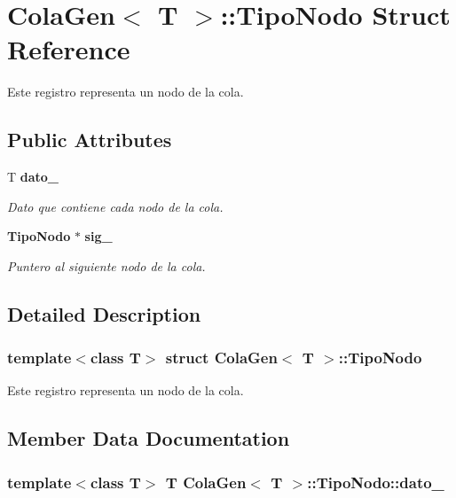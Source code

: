 \section{ColaGen$<$ T $>$::TipoNodo Struct Reference}
\label{structColaGen_1_1TipoNodo}
Este registro representa un nodo de la cola.  


\subsection*{Public Attributes}
\begin{CompactItemize}
\item 
T {\bf dato\_\-}
\begin{CompactList}\small\item\em Dato que contiene cada nodo de la cola. \item\end{CompactList}\item 
{\bf TipoNodo} $\ast$ {\bf sig\_\-}
\begin{CompactList}\small\item\em Puntero al siguiente nodo de la cola. \item\end{CompactList}\end{CompactItemize}


\subsection{Detailed Description}
\subsubsection*{template$<$class T$>$ struct ColaGen$<$ T $>$::TipoNodo}

Este registro representa un nodo de la cola. 



\subsection{Member Data Documentation}
\subsubsection{\setlength{\rightskip}{0pt plus 5cm}template$<$class T$>$ T {\bf ColaGen}$<$ T $>$::{\bf TipoNodo::dato\_\-}}\label{structColaGen_1_1TipoNodo_31f8745e4e161ac46e76898dc7285207}



